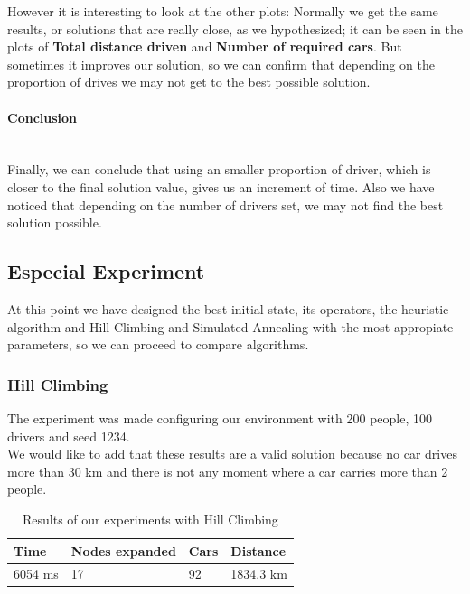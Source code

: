 \documentclass[12]{article}
\begin{document}
 However it is interesting to look at the other plots:
Normally we get the same results, or solutions that are really close, as we hypothesized; it can be seen in the plots of \textbf{Total distance driven} and \textbf{Number of required cars}. But sometimes it improves our solution, so we can confirm that depending on the proportion of drives we may not get to the best possible solution. 
    

\paragraph{Conclusion}\mbox{}\\

Finally, we can conclude that using an smaller proportion of driver, which is closer to the final solution value, gives us an increment of time. Also we have noticed that depending on the number of drivers set, we may not find the best solution possible. 

\subsection{Especial Experiment}

At this point we have designed the best initial state, its operators, the heuristic algorithm and Hill Climbing and Simulated Annealing with the most appropiate parameters, so we can proceed to compare algorithms. 


\subsubsection{Hill Climbing}

The experiment was made configuring our environment with 200 people, 100 drivers and seed 1234.
\\

We would like to add that these results are a valid solution because no car drives more than 30 km and there is not any moment where a car carries more than 2 people. 
\\

\begin{table}[h]
\centering
\begin{tabular}{|l|l|l|l|}
\hline \textbf{Time} &
 \textbf{Nodes expanded} & \textbf{Cars} & \textbf{Distance}\\  \hline
6054 ms &  17 & 92 & 1834.3 km \\ \hline
\end{tabular}
\caption{Results of our experiments with Hill Climbing}
\label{Results}
\end{table}
\end{document}
